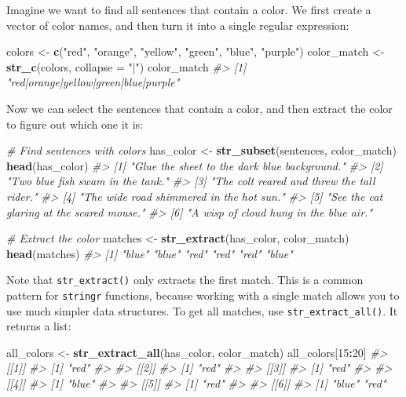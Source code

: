 \documentclass[]{book}
\newenvironment{Shaded}{\begin{snugshade}}{\end{snugshade}}
\newcommand{\KeywordTok}[1]{\textcolor[rgb]{0.13,0.29,0.53}{\textbf{#1}}}
\newcommand{\DataTypeTok}[1]{\textcolor[rgb]{0.13,0.29,0.53}{#1}}
\newcommand{\DecValTok}[1]{\textcolor[rgb]{0.00,0.00,0.81}{#1}}
\newcommand{\StringTok}[1]{\textcolor[rgb]{0.31,0.60,0.02}{#1}}
\newcommand{\CommentTok}[1]{\textcolor[rgb]{0.56,0.35,0.01}{\textit{#1}}}
\newcommand{\OperatorTok}[1]{\textcolor[rgb]{0.81,0.36,0.00}{\textbf{#1}}}
\newcommand{\NormalTok}[1]{#1}
\begin{document}
Imagine we want to find all sentences that contain a color. We first
create a vector of color names, and then turn it into a single regular
expression:

\begin{Shaded}
\begin{Highlighting}[]
\NormalTok{colors <-}\StringTok{ }\KeywordTok{c}\NormalTok{(}\StringTok{"red"}\NormalTok{, }\StringTok{"orange"}\NormalTok{, }\StringTok{"yellow"}\NormalTok{, }\StringTok{"green"}\NormalTok{, }\StringTok{"blue"}\NormalTok{, }\StringTok{"purple"}\NormalTok{)}
\NormalTok{color_match <-}\StringTok{ }\KeywordTok{str_c}\NormalTok{(colors, }\DataTypeTok{collapse =} \StringTok{"|"}\NormalTok{)}
\NormalTok{color_match}
\CommentTok{#> [1] "red|orange|yellow|green|blue|purple"}
\end{Highlighting}
\end{Shaded}

Now we can select the sentences that contain a color, and then extract
the color to figure out which one it is:

\begin{Shaded}
\begin{Highlighting}[]
\CommentTok{# Find sentences with colors}
\NormalTok{has_color <-}\StringTok{ }\KeywordTok{str_subset}\NormalTok{(sentences, color_match)}
\KeywordTok{head}\NormalTok{(has_color)}
\CommentTok{#> [1] "Glue the sheet to the dark blue background."}
\CommentTok{#> [2] "Two blue fish swam in the tank."            }
\CommentTok{#> [3] "The colt reared and threw the tall rider."  }
\CommentTok{#> [4] "The wide road shimmered in the hot sun."    }
\CommentTok{#> [5] "See the cat glaring at the scared mouse."   }
\CommentTok{#> [6] "A wisp of cloud hung in the blue air."}

\CommentTok{# Extract the color}
\NormalTok{matches <-}\StringTok{ }\KeywordTok{str_extract}\NormalTok{(has_color, color_match)}
\KeywordTok{head}\NormalTok{(matches)}
\CommentTok{#> [1] "blue" "blue" "red"  "red"  "red"  "blue"}
\end{Highlighting}
\end{Shaded}

Note that \texttt{str\_extract()} only extracts the first match. This is
a common pattern for \texttt{stringr} functions, because working with a
single match allows you to use much simpler data structures. To get all
matches, use \texttt{str\_extract\_all()}. It returns a list:

\begin{Shaded}
\begin{Highlighting}[]
\NormalTok{all_colors <-}\StringTok{ }\KeywordTok{str_extract_all}\NormalTok{(has_color, color_match)}
\NormalTok{all_colors[}\DecValTok{15}\OperatorTok{:}\DecValTok{20}\NormalTok{]}
\CommentTok{#> [[1]]}
\CommentTok{#> [1] "red"}
\CommentTok{#> }
\CommentTok{#> [[2]]}
\CommentTok{#> [1] "red"}
\CommentTok{#> }
\CommentTok{#> [[3]]}
\CommentTok{#> [1] "red"}
\CommentTok{#> }
\CommentTok{#> [[4]]}
\CommentTok{#> [1] "blue"}
\CommentTok{#> }
\CommentTok{#> [[5]]}
\CommentTok{#> [1] "red"}
\CommentTok{#> }
\CommentTok{#> [[6]]}
\CommentTok{#> [1] "blue" "red"}
\end{Highlighting}
\end{Shaded}
\end{document}
